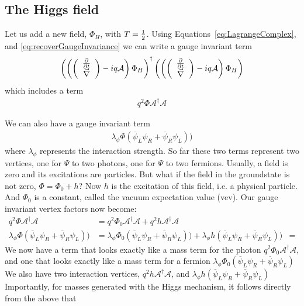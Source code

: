 \subsection{The Higgs field}

Let us add a new field, $\Phi_H$, with $T=\frac{1}{2}$. Using Equations~\ref{eq:LagrangeComplex}, and \ref{eq:recoverGaugeInvariance} we can write a gauge invariant term
\begin{equation}
\left(\left( \left( \begin{array}{c}  \frac{\partial}{\partial t}  \\ \vec{\nabla} \end{array} \right)
- iq\mathcal{A}\right) \Phi_H \right)^{\dagger}
\left(\left( \left( \begin{array}{c}  \frac{\partial}{\partial t}  \\ \vec{\nabla} \end{array} \right)
- iq\mathcal{A}\right) \Phi_H \right)
\end{equation}
which includes a term
\begin{align}
q^2 \Phi \mathcal{A}^{\dagger} \mathcal{A}
\end{align}

We can also have a gauge invariant term
\begin{align}
\lambda_{\phi} \Phi (\overline{\psi}_L\psi_R + \overline{\psi}_R\psi_L))
\end{align}
where $\lambda_{\phi}$ represents the interaction strength.
So far these two terms represent two vertices, one for $\Psi$ to two photons, one for $\Psi$ to two fermions.
 Usually, a field is zero and its excitations are particles. But what if the field in the groundstate is not zero, $\Phi = \Phi_0 + h$? Now $h$ is the excitation of this field, i.e. a physical particle. And $\Phi_0$ is a constant, called the vacuum expectation value (vev). Our gauge invariant vertex factors now become:
\begin{align}
q^2 \Phi \mathcal{A}^{\dagger} \mathcal{A} &= 
q^2 \Phi_0 \mathcal{A}^{\dagger} \mathcal{A} + q^2 h \mathcal{A}^{\dagger} \mathcal{A} 
\\
\lambda_{\phi} \Phi (\overline{\psi}_L\psi_R + \overline{\psi}_R\psi_L)) &=
\lambda_{\phi} \Phi_0 (\overline{\psi}_L\psi_R + \overline{\psi}_R\psi_L)) +
\lambda_{\phi} h (\overline{\psi}_L\psi_R + \overline{\psi}_R\psi_L)) &=
\end{align}
%
We now have a term that looks exactly like a mass term for the photon \(q^2 \Phi_0 \mathcal{A}^{\dagger} \mathcal{A}\), and one that looks exactly like a mass term for a fermion \(\lambda_{\phi} \Phi_0 (\overline{\psi}_L\psi_R + \overline{\psi}_R\psi_L)\)
%
%
We also have two interaction vertices, \(q^2 h \mathcal{A}^{\dagger} \mathcal{A}\), and \(\lambda_{\phi} h (\overline{\psi}_L\psi_R + \overline{\psi}_R\psi_L)\)
Importantly, for masses generated with the Higgs mechanism, it follows directly from the above that\\
\\

